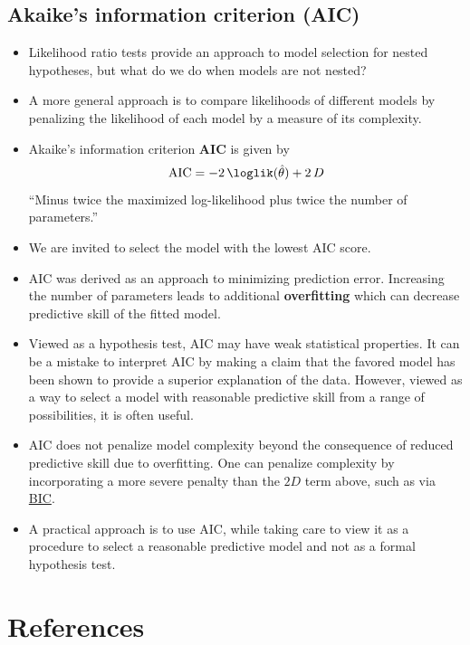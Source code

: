 \documentclass[
  letterpaper,
  DIV=11,
  numbers=noendperiod]{scrartcl}
\providecommand{\tightlist}{%
  \setlength{\itemsep}{0pt}\setlength{\parskip}{0pt}}\usepackage{longtable,booktabs,array}
\begin{document}
\hypertarget{akaikes-information-criterion-aic}{%
\subsection{Akaike's information criterion
(AIC)}\label{akaikes-information-criterion-aic}}

\begin{itemize}
\tightlist
\item
  Likelihood ratio tests provide an approach to model selection for
  nested hypotheses, but what do we do when models are not nested?
\item
  A more general approach is to compare likelihoods of different models
  by penalizing the likelihood of each model by a measure of its
  complexity.
\item
  Akaike's information criterion \textbf{AIC} is given by
  \begin{equation*}
    \mathrm{AIC} = -2\,\loglik(\hat{\theta}) + 2\,D
  \end{equation*} ``Minus twice the maximized log-likelihood plus twice
  the number of parameters.''
\item
  We are invited to select the model with the lowest AIC score.
\item
  AIC was derived as an approach to minimizing prediction error.
  Increasing the number of parameters leads to additional
  \textbf{overfitting} which can decrease predictive skill of the fitted
  model.
\item
  Viewed as a hypothesis test, AIC may have weak statistical properties.
  It can be a mistake to interpret AIC by making a claim that the
  favored model has been shown to provide a superior explanation of the
  data. However, viewed as a way to select a model with reasonable
  predictive skill from a range of possibilities, it is often useful.
\item
  AIC does not penalize model complexity beyond the consequence of
  reduced predictive skill due to overfitting. One can penalize
  complexity by incorporating a more severe penalty than the \(2D\) term
  above, such as via
  \href{https://en.wikipedia.org/wiki/Bayesian_information_criterion}{BIC}.
\item
  A practical approach is to use AIC, while taking care to view it as a
  procedure to select a reasonable predictive model and not as a formal
  hypothesis test.
\end{itemize}

\hypertarget{references}{%
\section{References}\label{references}}
\end{document}
